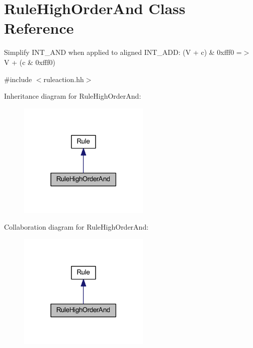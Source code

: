 \hypertarget{class_rule_high_order_and}{}\section{Rule\+High\+Order\+And Class Reference}
\label{class_rule_high_order_and}


Simplify I\+N\+T\+\_\+\+A\+ND when applied to aligned I\+N\+T\+\_\+\+A\+DD\+: {\ttfamily (V + c) \& 0xfff0 =$>$ V + (c \& 0xfff0)}  




{\ttfamily \#include $<$ruleaction.\+hh$>$}



Inheritance diagram for Rule\+High\+Order\+And\+:
\nopagebreak
\begin{figure}[H]
\begin{center}
\leavevmode
\includegraphics[width=177pt]{class_rule_high_order_and__inherit__graph}
\end{center}
\end{figure}


Collaboration diagram for Rule\+High\+Order\+And\+:
\nopagebreak
\begin{figure}[H]
\begin{center}
\leavevmode
\includegraphics[width=177pt]{class_rule_high_order_and__coll__graph}
\end{center}
\end{figure}
